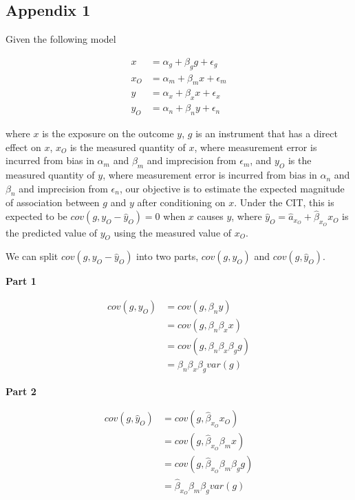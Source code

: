 \documentclass[]{article}
\begin{document}
\newpage

\subsection{Appendix 1}\label{appendix-1}

Given the following model

\[
\begin{aligned}
x   & = \alpha_g + \beta_g g + \epsilon_g \\
x_O & = \alpha_m + \beta_m x + \epsilon_m \\
y   & = \alpha_x + \beta_x x + \epsilon_x \\
y_O & = \alpha_n + \beta_n y + \epsilon_n
\end{aligned}
\]

where \(x\) is the exposure on the outcome \(y\), \(g\) is an instrument
that has a direct effect on \(x\), \(x_O\) is the measured quantity of
\(x\), where measurement error is incurred from bias in \(\alpha_m\) and
\(\beta_m\) and imprecision from \(\epsilon_m\), and \(y_O\) is the
measured quantity of \(y\), where measurement error is incurred from
bias in \(\alpha_n\) and \(\beta_n\) and imprecision from
\(\epsilon_n\), our objective is to estimate the expected magnitude of
association between \(g\) and \(y\) after conditioning on \(x\). Under
the CIT, this is expected to be \(cov(g, y_O - \hat{y}_O) = 0\) when
\(x\) causes \(y\), where
\(\hat{y}_O = \hat{a}_{x_O} + \hat{\beta}_{x_O} x_O\) is the predicted
value of \(y_O\) using the measured value of \(x_O\).

We can split \(cov(g, y_O - \hat{y}_O)\) into two parts, \(cov(g, y_O)\)
and \(cov(g, \hat{y}_O)\).

\textbf{Part 1}

\[
\begin{aligned}
cov(g, y_O) & = cov(g, \beta_n y) \\
            & = cov(g, \beta_n \beta_x x) \\
            & = cov(g, \beta_n \beta_x \beta_g g) \\
            & = \beta_n \beta_x \beta_g var(g)
\end{aligned}
\]

\textbf{Part 2}

\[
\begin{aligned}
cov(g, \hat{y}_O) & = cov(g, \hat{\beta}_{x_O} x_O) \\
                  & = cov(g, \hat{\beta}_{x_O} \beta_m x) \\
                  & = cov(g, \hat{\beta}_{x_O} \beta_m \beta_g g) \\
                  & = \hat{\beta}_{x_O} \beta_m \beta_g var(g)
\end{aligned}
\]
\end{document}
